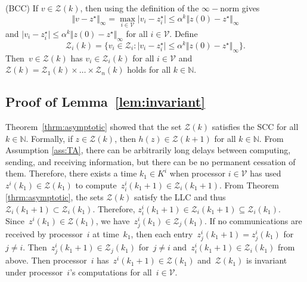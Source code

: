 \documentclass[9pt,shortpaper,twoside,web]{ieeecolor}
\newcommand{\Z}{\ensuremath{\mathcal{Z}}\xspace}
\newcommand{\V}{\ensuremath{\mathcal{V}}\xspace}
\begin{document}
        (BCC) If $v\in \Z(k)$, then using the definition of the $\infty-$norm gives 
        \begin{equation}
            \Vert v- z^\star\Vert_\infty = \max_{i\in\V}\vert v_i-z^\star_i\vert \leq \alpha^k\Vert z(0)-z^\star\Vert_\infty
        \end{equation}
        and $\vert v_i-z^\star_i\vert \leq \alpha^k\Vert z(0)-z^\star\Vert_\infty$ for all $i\in \V$.
        Define
        \begin{equation}
            \Z_i(k) =\{v_i\in \Z_i : \vert v_i-z^\star_i\vert \leq \alpha^k\Vert z(0)-z^\star\Vert_\infty\}.
        \end{equation}
        Then~$v \in \Z(k)$ has $v_i \in \Z_i(k)$ for all $i \in \V$ and
        $\Z(k)=\Z_1(k)\times\dots\times \Z_n(k)$ holds for all $k\in\mathbb N$.    

        \subsection{Proof of Lemma~\ref{lem:invariant}} \label{app:invariant}
        Theorem~\ref{thrm:asymptotic}
        showed that the set $\Z(k)$ satisfies the SCC for all $k \in \mathbb N$.
    Formally, if $z \in \Z(k)$, then $h(z)\in\Z(k+1)$ for all $k\in\mathbb N$.
    From Assumption \ref{ass:TA}, there can be arbitrarily long delays between computing, sending, and receiving information, but there can be no permanent cessation of them.
    Therefore, there exists a time $k_1\in K^i$ when processor $i\in\V$ has 
    used~$z^i(k_1)\in\Z(k_1)$ to compute~$z^i_i(k_1+1)\in\Z_i(k_1+1)$.
    From Theorem \ref{thrm:asymptotic}, the sets $\Z(k)$ satisfy the LLC and thus~$\Z_i(k_1+1)\subset \Z_i(k_1)$.
    Therefore, $z^i_i(k_1+1) \in \Z_i(k_1 + 1) \subseteq \Z_i(k_1)$.
    Since~$z^i(k_1) \in \Z(k_1)$, we have~$z^i_j(k_1) \in \Z_j(k_1)$. 
    If no communications are received by processor~$i$ at time~$k_1$, then 
    each entry~$z^i_j(k_1+1) = z^i_j(k_1)$ for~$j \neq i$. 
    Then~$z^i_j(k_1+1) \in \Z_j(k_1)$ for~$j \neq i$
    and~$z^i_i(k_1+1) \in \Z_i(k_1)$ from above. 
    Then processor~$i$ has~$z^i(k_1+1) \in \Z(k_1)$ and~$\Z(k_1)$
    is invariant under processor~$i$'s computations for all~$i \in \V$.
\end{document}
